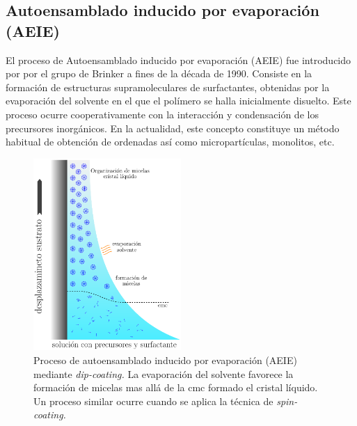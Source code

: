 	\subsection{Autoensamblado inducido por evaporación (AEIE)}

	 El proceso de Autoensamblado inducido por evaporación (AEIE) fue introducido por por el grupo de Brinker a fines de la década de 1990.\cite{Lu1997,Brinker1999} Consiste en la formación de estructuras supramoleculares de surfactantes, obtenidas por la evaporación del solvente en el que el polímero se halla inicialmente disuelto. Este proceso ocurre cooperativamente con la interacción y condensación de los precursores inorgánicos. En la actualidad, este concepto constituye un método habitual de obtención de \pdm\space ordenadas\cite{Grosso2004} así como micropartículas, monolitos, etc.\cite{Yang1998a}

	 	\begin{figure}[h!]
 				\begin{center}
 				\includegraphics[width=0.5\textwidth]{Esquemas/autoensam.pdf}
 				\caption[Proceso de autoensamblado inducido por evaporación (AEIE)]{Proceso de autoensamblado inducido por evaporación (AEIE) mediante \textit{dip-coating.} La evaporación del solvente favorece la formación de micelas mas allá de la cmc formado el cristal líquido. Un proceso similar ocurre cuando se aplica la técnica de \textit{spin-coating.}}
 		   		\label{fig:autoensam}
 		    	\end{center}
 		    	\end{figure}

